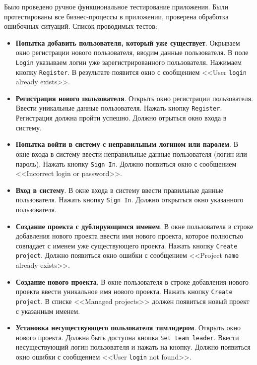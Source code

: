 Было проведено ручное функциональное тестирование приложения. Были протестированы все бизнес-процессы в приложении, проверена обработка ошибочных ситуаций. Список проводимых тестов:
\begin{itemize}
\item \textbf{Попытка добавить пользователя, который уже существует}. Окрываем окно регистрации нового пользователя, вводим данные пользователя. В поле \texttt{Login} указываем логин уже зарегистрированного пользователя. Нажимаем кнопку \texttt{Register}. В результате появится окно с сообщением <<User \texttt{login} already exists>>.

\item \textbf{Регистрация нового пользователя}. Открыть окно регистрации пользователя. Ввести уникальные данные пользователя. Нажать кнопку \texttt{Register}. Регистрация должна пройти успешно. Должно отрыться окно входа в систему.

\item \textbf{Попытка войти в систему с неправильным логином или паролем}. В окне входа в систему ввести неправильные данные пользователя (логин или пароль). Нажать кнопку \texttt{Sign In}. Должно появиться окно с сообщением <<Incorrect login or password>>.

\item \textbf{Вход в систему}. В окне входа в систему ввести правильные данные пользователя. Нажать кнопку \texttt{Sign In}. Должно открыться окно указанного пользователя.

\item \textbf{Создание проекта с дублирующимся именем}. В окне пользователя в строке добавления нового проекта ввести имя нового проекта, которое полностью совпадает с именем уже существующего проекта. Нажать кнопку \texttt{Create project}. Должно появиться окно ошибки с сообщением <<Project \texttt{name} already exists>>.

\item \textbf{Создание нового проекта}. В окне пользователя в строке добавления нового проекта ввести уникальное имя нового проекта. Нажать кнопку \texttt{Create project}. В списке <<Managed projects>> должен появиться новый проект с указанным именем.

\item \textbf{Установка несуществующего пользователя тимлидером}. Открыть окно нового проекта. Должна быть доступна кнопка \texttt{Set team leader}. Ввести несуществующий логин пользователя и нажать на кнопку. Должно появиться окно ошибки с сообщением <<User \texttt{login} not found>>.


\end{itemize}

